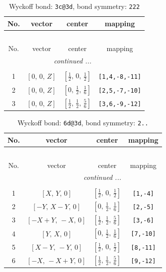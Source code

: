 \documentclass[fleqn,8pt]{jsarticle}
\begin{document}
\renewcommand{\arraystretch}{1.2}
\begin{longtable}{cccc}
\caption{Wyckoff bond: {\tt 3c@3d}, bond symmetry: {\tt 222}}
 \\
 \hline \hline
No. & vector & center & mapping \\ \hline \endfirsthead

\multicolumn{3}{l}{\tablename\ \thetable{}} \\
 \hline \hline
No. & vector & center & mapping \\ \hline \endhead

 \hline \hline
\multicolumn{3}{r}{\footnotesize\it continued ...} \\ \endfoot

 \hline \hline
\multicolumn{3}{r}{} \\ \endlastfoot

1 & $\left[ 0,\, 0,\, Z \right]$ & $\left[ \frac{1}{2},\, 0,\, \frac{1}{2} \right]$ & {\tt [1,4,-8,-11]} \\ \hline
2 & $\left[ 0,\, 0,\, Z \right]$ & $\left[ 0,\, \frac{1}{2},\, \frac{1}{6} \right]$ & {\tt [2,5,-7,-10]} \\ \hline
3 & $\left[ 0,\, 0,\, Z \right]$ & $\left[ \frac{1}{2},\, \frac{1}{2},\, \frac{5}{6} \right]$ & {\tt [3,6,-9,-12]} \\
\end{longtable}
\renewcommand{\arraystretch}{1.2}
\begin{longtable}{cccc}
\caption{Wyckoff bond: {\tt 6d@3d}, bond symmetry: {\tt 2..}}
 \\
 \hline \hline
No. & vector & center & mapping \\ \hline \endfirsthead

\multicolumn{3}{l}{\tablename\ \thetable{}} \\
 \hline \hline
No. & vector & center & mapping \\ \hline \endhead

 \hline \hline
\multicolumn{3}{r}{\footnotesize\it continued ...} \\ \endfoot

 \hline \hline
\multicolumn{3}{r}{} \\ \endlastfoot

1 & $\left[ X,\, Y,\, 0 \right]$ & $\left[ \frac{1}{2},\, 0,\, \frac{1}{2} \right]$ & {\tt [1,-4]} \\ \hline
2 & $\left[ - Y,\, X - Y,\, 0 \right]$ & $\left[ 0,\, \frac{1}{2},\, \frac{1}{6} \right]$ & {\tt [2,-5]} \\ \hline
3 & $\left[ - X + Y,\, - X,\, 0 \right]$ & $\left[ \frac{1}{2},\, \frac{1}{2},\, \frac{5}{6} \right]$ & {\tt [3,-6]} \\ \hline
4 & $\left[ Y,\, X,\, 0 \right]$ & $\left[ 0,\, \frac{1}{2},\, \frac{1}{6} \right]$ & {\tt [7,-10]} \\ \hline
5 & $\left[ X - Y,\, - Y,\, 0 \right]$ & $\left[ \frac{1}{2},\, 0,\, \frac{1}{2} \right]$ & {\tt [8,-11]} \\ \hline
6 & $\left[ - X,\, - X + Y,\, 0 \right]$ & $\left[ \frac{1}{2},\, \frac{1}{2},\, \frac{5}{6} \right]$ & {\tt [9,-12]} \\
\end{longtable}
\end{document}
